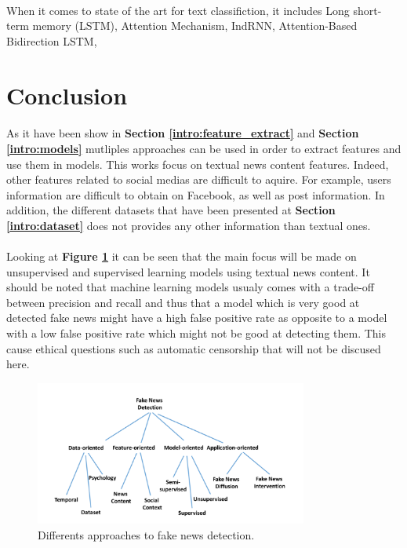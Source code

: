 \paragraph{}
When it comes to state of the art for text classifiction, it includes Long short-term memory (LSTM)\cite{Hochreiter1997LongSM}, Attention Mechanism\cite{Vaswani2017AttentionIA}, IndRNN\cite{Li2018}, Attention-Based Bidirection LSTM\cite{zhou-etal-2016-attention}, 
\section{Conclusion}
\paragraph{} As it have been show in \textbf{Section \ref{intro:feature_extract}} and \textbf{Section \ref{intro:models}} mutliples approaches can be used in order to extract features and use them in models. This works focus on textual news content features. Indeed, other features related to social medias are difficult to aquire. For example, users information are difficult to obtain on Facebook, as well as post information. In addition, the different datasets that have been presented at \textbf{Section \ref{intro:dataset}} does not provides any other information than textual ones. 

\paragraph{} Looking at \textbf{Figure \ref{fig:intro:features}} it can be seen that the main focus will be made on unsupervised and supervised learning models using textual news content. It should be noted that machine learning models usualy comes with a trade-off between precision and recall and thus that a model which is very good at detected fake news might have a high false positive rate as opposite to a model with a low false positive rate which might not be good at detecting them. This cause ethical questions such as automatic censorship that will not be discused here. 

\begin{figure}
	\centering
	\includegraphics[width=0.8\textwidth]{chapter/images/introduction/features}
	\caption{Differents approaches to fake news detection.}
	\label{fig:intro:features}
\end{figure}